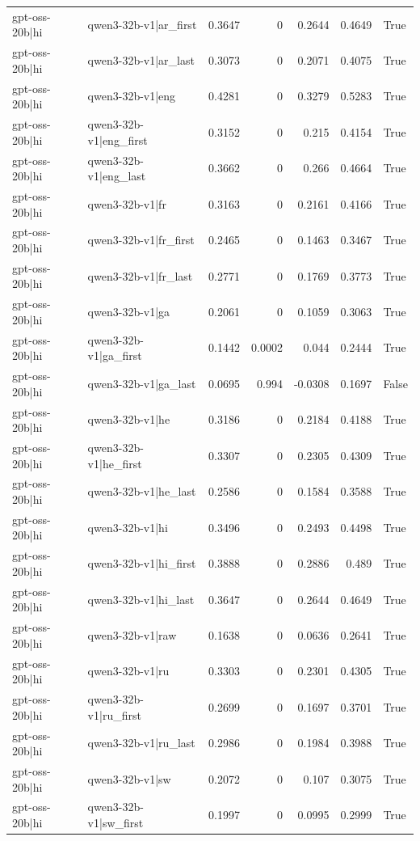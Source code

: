 \begin{table}
\begin{tabular}{l l r r r r l}
gpt-oss-20b|hi & qwen3-32b-v1|ar_first & 0.3647 & 0 & 0.2644 & 0.4649 & True \\
gpt-oss-20b|hi & qwen3-32b-v1|ar_last & 0.3073 & 0 & 0.2071 & 0.4075 & True \\
gpt-oss-20b|hi & qwen3-32b-v1|eng & 0.4281 & 0 & 0.3279 & 0.5283 & True \\
gpt-oss-20b|hi & qwen3-32b-v1|eng_first & 0.3152 & 0 & 0.215 & 0.4154 & True \\
gpt-oss-20b|hi & qwen3-32b-v1|eng_last & 0.3662 & 0 & 0.266 & 0.4664 & True \\
gpt-oss-20b|hi & qwen3-32b-v1|fr & 0.3163 & 0 & 0.2161 & 0.4166 & True \\
gpt-oss-20b|hi & qwen3-32b-v1|fr_first & 0.2465 & 0 & 0.1463 & 0.3467 & True \\
gpt-oss-20b|hi & qwen3-32b-v1|fr_last & 0.2771 & 0 & 0.1769 & 0.3773 & True \\
gpt-oss-20b|hi & qwen3-32b-v1|ga & 0.2061 & 0 & 0.1059 & 0.3063 & True \\
gpt-oss-20b|hi & qwen3-32b-v1|ga_first & 0.1442 & 0.0002 & 0.044 & 0.2444 & True \\
gpt-oss-20b|hi & qwen3-32b-v1|ga_last & 0.0695 & 0.994 & -0.0308 & 0.1697 & False \\
gpt-oss-20b|hi & qwen3-32b-v1|he & 0.3186 & 0 & 0.2184 & 0.4188 & True \\
gpt-oss-20b|hi & qwen3-32b-v1|he_first & 0.3307 & 0 & 0.2305 & 0.4309 & True \\
gpt-oss-20b|hi & qwen3-32b-v1|he_last & 0.2586 & 0 & 0.1584 & 0.3588 & True \\
gpt-oss-20b|hi & qwen3-32b-v1|hi & 0.3496 & 0 & 0.2493 & 0.4498 & True \\
gpt-oss-20b|hi & qwen3-32b-v1|hi_first & 0.3888 & 0 & 0.2886 & 0.489 & True \\
gpt-oss-20b|hi & qwen3-32b-v1|hi_last & 0.3647 & 0 & 0.2644 & 0.4649 & True \\
gpt-oss-20b|hi & qwen3-32b-v1|raw & 0.1638 & 0 & 0.0636 & 0.2641 & True \\
gpt-oss-20b|hi & qwen3-32b-v1|ru & 0.3303 & 0 & 0.2301 & 0.4305 & True \\
gpt-oss-20b|hi & qwen3-32b-v1|ru_first & 0.2699 & 0 & 0.1697 & 0.3701 & True \\
gpt-oss-20b|hi & qwen3-32b-v1|ru_last & 0.2986 & 0 & 0.1984 & 0.3988 & True \\
gpt-oss-20b|hi & qwen3-32b-v1|sw & 0.2072 & 0 & 0.107 & 0.3075 & True \\
gpt-oss-20b|hi & qwen3-32b-v1|sw_first & 0.1997 & 0 & 0.0995 & 0.2999 & True \\

\end{tabular}
\end{table}
